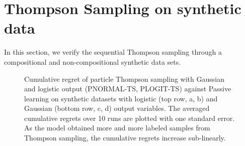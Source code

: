 \section{Thompson Sampling on synthetic data}
In this section, we verify the sequential Thompson sampling through a compositional and non-compositional synthetic data sets.
\label{sec:thompson_synthetic}
\begin{figure}[t]
	\centering
	\caption{\label{fig:synthetic} Cumulative regret of particle Thompson sampling with Gaussian and logistic output (PNORMAL-TS, PLOGIT-TS) against Passive learning
	on synthetic datasets with logistic	(top row, a, b) and Gaussian (bottom row, c, d) output variables.
	The averaged cumulative regrets over 10 runs are plotted with one standard error.
	As the model obtained more and more labeled samples from Thompson sampling,
	the cumulative regrets increase sub-linearly.}
\end{figure}

